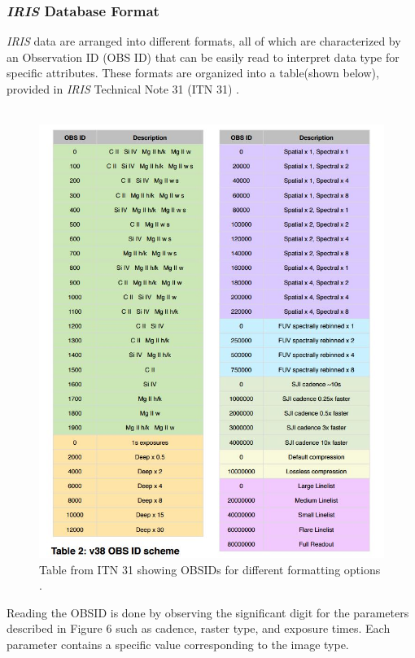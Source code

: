 \documentclass[10pt,a4paper,titlepage]{article}
\begin{document}
			\subsubsection{\textit{IRIS} Database Format}
				\textit{IRIS} data are arranged into different formats, all of which are characterized by an Observation ID (OBS ID) that can be easily read to interpret data type for specific attributes. These formats are organized into a table(shown below), provided in \textit{IRIS} Technical Note 31 (ITN 31) \cite{ITN31}.\\\\
				\begin{figure}[H]
					\includegraphics[scale=0.62]{obsid}
					\centering
					\caption{Table from ITN 31 showing OBSIDs for different formatting options \cite{ITN31}.}
					\centering
				\end{figure}
			
						
				Reading the OBSID is done by observing the significant digit for the parameters described in Figure 6 such as cadence, raster type, and exposure times. Each parameter contains a specific value corresponding to the image type.
				
\end{document}
